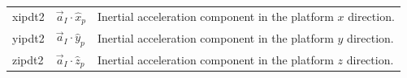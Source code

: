 
\begin{longtable}{@{}>{\ttfamily}p{}p{}p{}@{}}
  xipdt2 & $\vec a_I\mathbin{\cdot}\hat x_p$ &
    Inertial acceleration component in the platform $x$ direction.\\
  yipdt2 & $\vec a_I\mathbin{\cdot}\hat y_p$ &
    Inertial acceleration component in the platform $y$ direction.\\
  zipdt2 & $\vec a_I\mathbin{\cdot}\hat z_p$ &
    Inertial acceleration component in the platform $z$ direction.\\
\end{longtable}
